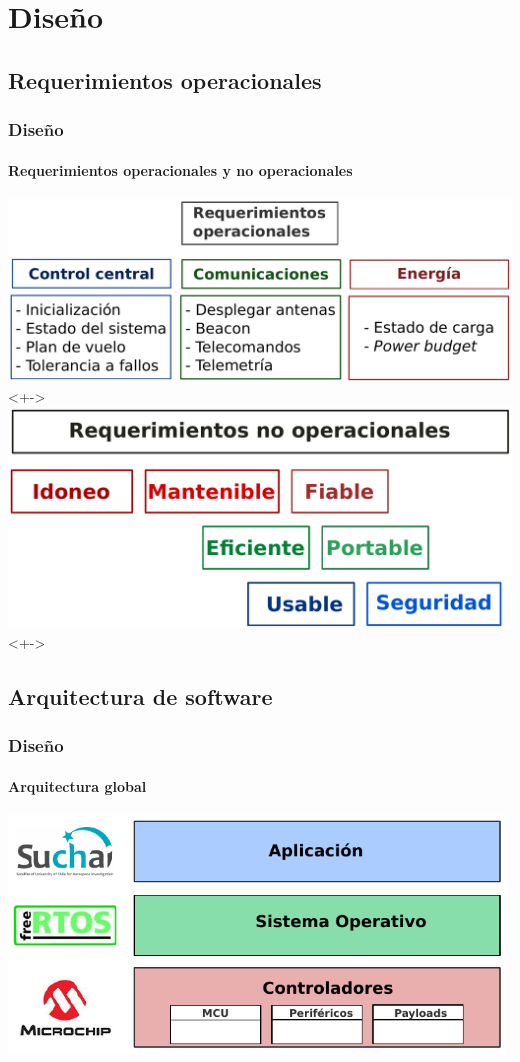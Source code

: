 \documentclass[xcolor=dvipsnames]{beamer}
\begin{document}
    \section{Diseño}
    \subsection{Requerimientos operacionales}
    \begin{frame}
        \frametitle{Diseño}
        \framesubtitle{Requerimientos operacionales y no operacionales}
        
        \centering
        \includegraphics[height=0.45\textheight]{img/requerimientos_op.pdf}<+->
        \vspace{0.5cm}
        \includegraphics[height=0.40\textheight]{img/requerimientos_noop.pdf}<+->
    \end{frame}

    \subsection{Arquitectura de software}
    \begin{frame}
        \frametitle{Diseño}
        \framesubtitle{Arquitectura global}
        
        \centering
        \includegraphics[width=0.99\textwidth]{img/arquitectura_global.pdf}

    \end{frame}
    
\end{document}
